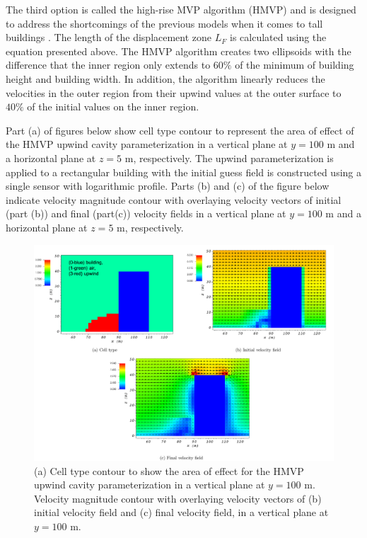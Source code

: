 The third option is called the high-rise MVP algorithm (HMVP) and is designed to address the shortcomings of the previous models when it comes to tall buildings  \cite{nelson20085}. The length of the displacement zone $L_F$ is calculated using the equation presented above. The HMVP algorithm creates two ellipsoids with the difference that the inner region only extends to $60\%$ of the minimum of building height and building width. In addition, the algorithm linearly reduces the velocities in the outer region from their upwind values at the outer surface to $40\%$ of the initial values on the inner region.

Part (a) of figures below show cell type contour to represent the area of effect of the HMVP upwind cavity parameterization in a vertical plane at $y=100$ m and a horizontal plane at $z=5$ m, respectively. The upwind parameterization is applied to a rectangular building with the initial guess field is constructed using a single sensor with logarithmic profile. Parts (b) and (c) of the figure below indicate velocity magnitude contour with overlaying velocity vectors of initial (part (b)) and final (part(c)) velocity fields in a vertical plane at $y=100$ m and a horizontal plane at $z=5$ m, respectively.

\begin{figure}[H]
    \centering
    \includegraphics[width=\textwidth]{Images/upwind_y_100_3.pdf}
    \caption{(a) Cell type contour to show the area of effect for the HMVP upwind cavity parameterization in a vertical plane at $y=100$ m. Velocity magnitude contour with overlaying velocity vectors of (b) initial velocity field and (c) final velocity field, in a vertical plane at $y=100$ m.}
\end{figure}

